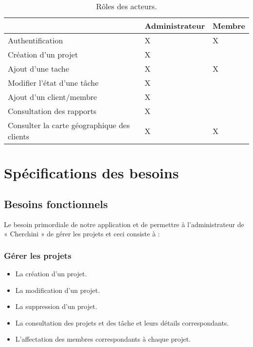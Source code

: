 \begin{table}[H]
\centering
\begin{tabular}{|l|l|l|}
\hline
                                            & Administrateur & Membre  \\
\hline
Authentification~                           & X              & X       \\
\hline
Création d’un projet                        & X              &         \\
\hline
Ajout d’une tache                           & X              & X       \\
\hline
Modifier l’état d’une tâche                 & X              &         \\
\hline
Ajout d’un client/membre                    & X              &         \\
\hline
Consultation des rapports                   & X              &         \\
\hline
Consulter la carte géographique des clients & X              & X       \\
\hline
\end{tabular}
\centering
\caption{Rôles  des acteurs.}
\end{table}


\section{ Sp\'{e}cifications des besoins}

  \subsection{Besoins fonctionnels}

Le besoin primordiale de notre application et de permettre à l’administrateur
de « Cherchini » de gérer les projets et ceci consiste à :

\subsubsection{G\'{e}rer les projets}

\begin{itemize}
\item{La cr\'{e}ation d’un projet.}
\item{La modification d'un projet.}
\item{La suppression d'un projet.}
\item{La consultation des projets et des t\^{a}che et leurs d\'{e}tails correspondants.}
\item{L'affectation des membres correspondants \`{a} chaque projet.}
\end{itemize}

